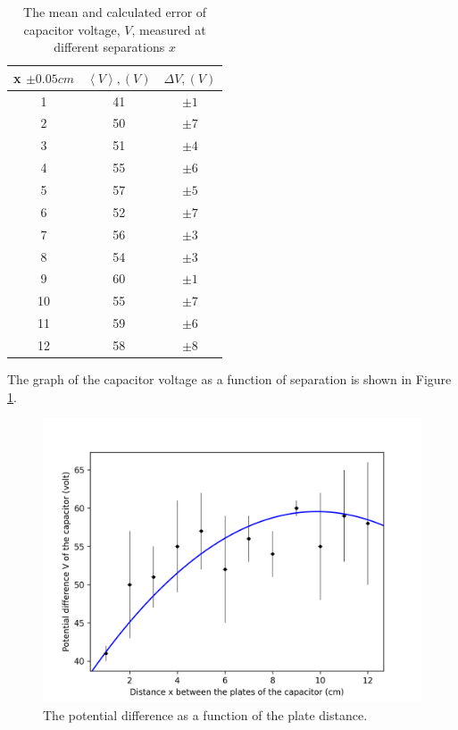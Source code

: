 \begin{table}[H]
    \begin{minipage}{\textwidth}
    \centering
        \caption{The mean and calculated error of capacitor voltage, $V$, measured at different separations $x$}
        \label{tab:results:exp3.1}
            \begin{tabular}{|c|c|c|} \hline 
             x $\pm 0.05 cm$   & $\left< V\right>, (V)$ & $\Delta V, (V)$ \\ \hline  
             1   & 41 & $\pm1$ \\ \hline 
             2   & 50 & $\pm7$\\ \hline 
             3   & 51 & $\pm4 $ \\ \hline  
             4   & 55 & $\pm6 $ \\ \hline 
             5   & 57 & $\pm5 $\\ \hline 
             6   & 52 & $\pm7$\\ \hline 
             7   & 56 & $\pm3 $\\ \hline 
             8   & 54 & $\pm3$\\ \hline 
             9   & 60 & $\pm1$\\ \hline 
             10  & 55 & $\pm7$\\ \hline 
             11  & 59 & $\pm6$\\ \hline 
             12  & 58 & $\pm8$\\ \hline
            \end{tabular}
    \end{minipage}
\end{table}

The graph of the capacitor voltage as a function of separation is shown in Figure \ref{fig:results:exp3.1}.

\begin{figure}[H]
    \centering
    \includegraphics[width=\textwidth]{capacitors/img/Capacitor_distance_vs_V_graph.png}
    \caption{The potential difference as a function of the plate distance.}
    \label{fig:results:exp3.1}
\end{figure}

